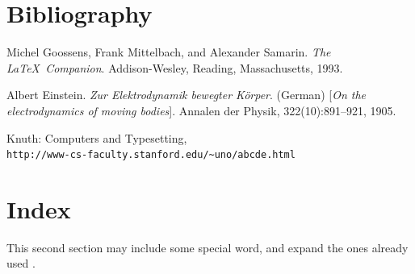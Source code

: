 \documentclass[a4paper,12pt]{report}%
\begin{document}
\chapter{\color{IAF} \bf Bibliography}
%

    Michel Goossens, Frank Mittelbach, and Alexander Samarin.
    \textit{The \LaTeX\ Companion}.
    Addison-Wesley, Reading, Massachusetts, 1993.

Albert Einstein.
    \textit{Zur Elektrodynamik bewegter K{\"o}rper}. (German)
    [\textit{On the electrodynamics of moving bodies}].
    Annalen der Physik, 322(10):891–921, 1905.

    Knuth: Computers and Typesetting,\\
    \texttt{http://www-cs-faculty.stanford.edu/\~{}uno/abcde.html}



\chapter{\color{IAF} \bf Index}
\makeindex[columns=3, title=Alphabetical Index]

This second section may include some special word,
and expand the ones already used .

\printindex

\end{document}
